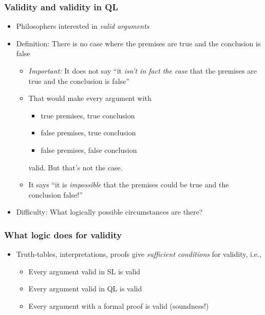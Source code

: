 \begin{frame}
    \frametitle{Validity and validity in QL}

\begin{itemize}[<+->]
\item Philosophers interested in \emph{valid arguments}
\item Definition: There is no case where the
premises are true and the conclusion is false
\begin{itemize}[<+->]
\item \emph{Important:} It does not say ``it \emph{isn't in fact the case} that the premises
are true and the conclusion is false''
\item That would make every argument with
\begin{itemize}[]
\item true premises, true conclusion
\item false premises, true conclusion
\item false premises, false conclusion
\end{itemize}
valid.  But that's not the case.
\item It says ``it is \emph{impossible} that the premises could be true and the conclusion false!''
\end{itemize}
\item Difficulty: What logically possible circumstances are there?
\end{itemize}

\end{frame}

\begin{frame}
    \frametitle{What logic does for validity}

\begin{itemize}[<+->]
\item Truth-tables, interpretations, proofs give \emph{sufficient conditions}
for validity, i.e.,
\begin{itemize}
\item Every argument valid in SL is valid
\item Every argument valid in QL is valid
\item Every argument with a formal proof is valid (soundness!)
\end{itemize}
\end{itemize}

\end{frame}

